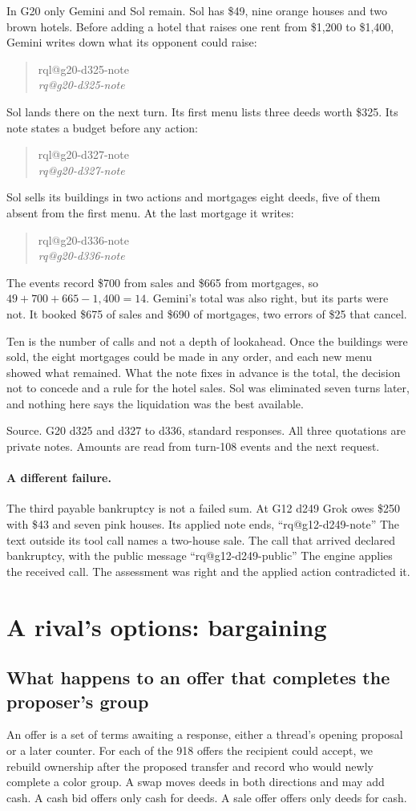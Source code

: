 \documentclass[11pt,letterpaper]{article}
\makeatletter
\newcommand{\QuoteCard}[1]{%
  \begin{quote}\small
  {\footnotesize\sffamily\color{black!65}\csname rql@#1\endcsname}\\[1pt]
  \itshape\csname rq@#1\endcsname
  \end{quote}}
\newcommand{\QuoteInline}[1]{``\csname rq@#1\endcsname''}
\newcommand{\Source}[1]{\par{\footnotesize\sffamily\color{black!65}Source. #1\par}}
\makeatother
\begin{document}
In G20 only Gemini and Sol remain. Sol has \$49, nine orange houses and two brown hotels. Before adding a hotel that raises one rent from \$1,200 to \$1,400, Gemini writes down what its opponent could raise:
\QuoteCard{g20-d325-note}
Sol lands there on the next turn. Its first menu lists three deeds worth \$325. Its note states a budget before any action:
\QuoteCard{g20-d327-note}
Sol sells its buildings in two actions and mortgages eight deeds, five of them absent from the first menu. At the last mortgage it writes:
\QuoteCard{g20-d336-note}
The events record \$700 from sales and \$665 from mortgages, so $49+700+665-1{,}400=14$. Gemini's total was also right, but its parts were not. It booked \$675 of sales and \$690 of mortgages, two errors of \$25 that cancel.

Ten is the number of calls and not a depth of lookahead. Once the buildings were sold, the eight mortgages could be made in any order, and each new menu showed what remained. What the note fixes in advance is the total, the decision not to concede and a rule for the hotel sales. Sol was eliminated seven turns later, and nothing here says the liquidation was the best available.
\Source{G20 d325 and d327 to d336, standard responses. All three quotations are private notes. Amounts are read from turn-108 events and the next request.}

\paragraph{A different failure.} The third payable bankruptcy is not a failed sum. At G12 d249 Grok owes \$250 with \$43 and seven pink houses. Its applied note ends, \QuoteInline{g12-d249-note} The text outside its tool call names a two-house sale. The call that arrived declared bankruptcy, with the public message \QuoteInline{g12-d249-public} The engine applies the received call. The assessment was right and the applied action contradicted it.

\section{A rival's options: bargaining}
\label{sec:rival}

\subsection{What happens to an offer that completes the proposer's group}

An offer is a set of terms awaiting a response, either a thread's opening proposal or a later counter. For each of the 918 offers the recipient could accept, we rebuild ownership after the proposed transfer and record who would newly complete a color group. A swap moves deeds in both directions and may add cash. A cash bid offers only cash for deeds. A sale offer offers only deeds for cash.
\end{document}
